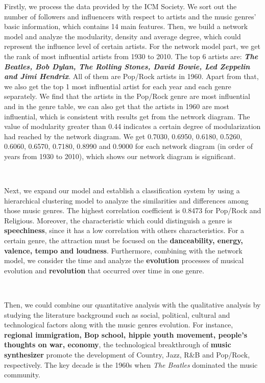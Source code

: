 \documentclass[12pt]{article}
\begin{document}
Firstly, we process the data provided by the ICM Society. We sort out the number of followers and influencers with respect to artists and the music genres' basic information, which contains 14 main features. Then, we build a network model and analyze the modularity, density and average degree, which could represent the influence level of certain artists.
For the network model part, we get the rank of most influential artists from 1930 to 2010. The top 6 artists are: \emph{\textbf{The Beatles, Bob Dylan, The Rolling Stones, David Bowie, Led Zeppelin and Jimi Hendrix}}. All of them are Pop/Rock artists in 1960. Apart from that, we also get the top 1 most influential artist for each year and each genre separately. We find that the artists in the Pop/Rock genre are most influential and in the genre table, we can also get that the artists in 1960 are most influential, which is consistent with results get from the network diagram. The value of modularity greater than 0.44 indicates a certain degree of modularization had reached by the network diagram. We get 0.7030, 0.6950, 0.6180, 0.5260, 0.6060, 0.6570, 0.7180, 0.8990 and 0.9000 for each network diagram (in order of years from 1930 to 2010), which shows our network diagram is significant.

~

Next, we expand our model and establish a classification system by using a hierarchical clustering model to analyze the similarities and differences among those music genres. The highest correlation coefficient is 0.8473 for Pop/Rock and Religious. Moreover, the characteristic which could distinguish a genre is \textbf{speechiness}, since it has a low correlation with others characteristics. For a certain genre, the attraction must be focused on the \textbf{danceability, energy, valence, tempo and loudness}. Furthermore, combining with the network model, we consider the time and analyze the \textbf{evolution} processes of musical evolution and \textbf{revolution} that occurred over time in one genre.

~

Then, we could combine our quantitative analysis with the qualitative analysis by studying the literature background such as social, political, cultural and technological factors along with the music genres evolution. For instance, \textbf{regional immigration, Bop school, hippie youth movement, people's thoughts on war, economy}, the technological breakthrough of \textbf{music synthesizer} promote the development of Country, Jazz, R\&B and Pop/Rock, respectively. The key decade is the 1960s when \emph{The Beatles} dominated the music community. 
\end{document}
